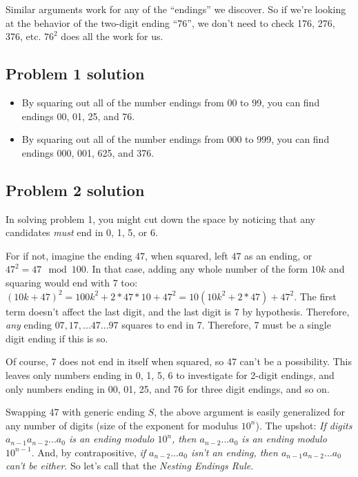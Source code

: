 \documentclass[11pt, oneside]{article} 	%
\begin{document}
Similar arguments work for any of the ``endings'' we discover.  So if we're looking at the behavior of the two-digit ending ``76'', we don't need to check 176, 276, 376, etc.  $76^2$ does all the work for us.

\subsection{Problem 1 solution}

\begin{itemize} 
\item By squaring out all of the number endings from 00 to 99, you can find  endings 00, 01, 25, and 76.
\item By squaring out all of the number endings from 000 to 999, you can find  endings 000, 001, 625, and 376.
\end{itemize} 

\subsection{Problem 2 solution} 

In solving problem 1, you might cut down the space by noticing that any candidates \emph{must} end in 0, 1, 5, or 6.  

For if not, imagine the ending $47$, when squared, left $47$ as an ending, or $47^2 = 47 \mod 100$.  In that case, adding any whole number of the form $10k$ and squaring would end with 7 too: $(10k+47)^2 = 100k^2 + 2*47*10 + 47^2 = 10(10k^2 + 2*47) + 47^2$.  The first term doesn't affect the last digit, and the last digit is $7$ by hypothesis.  Therefore, \emph{any} ending $07, 17, ... 47 ... 97$ squares to end in 7.  Therefore, 7 must be a single digit ending if this is so.

Of course, 7 does not end in itself when squared, so 47 can't be a possibility.  This leaves only numbers ending in 0, 1, 5, 6 to investigate for 2-digit endings, and only numbers ending in 00, 01, 25, and 76 for three digit endings, and so on.

Swapping 47 with generic ending $S$, the above argument is easily generalized for any number of digits (size of the exponent for modulus $10^n$).  The upshot: \emph{If digits $a_{n-1}a_{n-2}...a_0$ is an ending modulo $10^n$, then $a_{n-2}...a_0$ is an ending modulo $10^{n-1}$}.  And, by contrapositive, \emph{if $a_{n-2}...a_0$ isn't an ending, then $a_{n-1}a_{n-2}...a_0$ can't be either}.  So let's call that the \emph{Nesting Endings Rule}.
\end{document}

